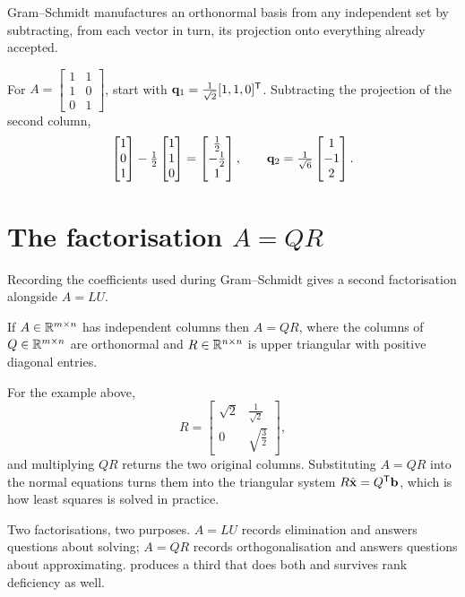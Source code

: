 Gram--Schmidt manufactures an orthonormal basis from any independent set by
subtracting, from each vector in turn, its projection onto everything already
accepted.

\begin{example}
For \(A=\begin{bmatrix}1&1\\1&0\\0&1\end{bmatrix}\), start with
\(\mathbf{q}_1=\tfrac{1}{\sqrt2}[1,1,0]^{\mathsf{T}}\). Subtracting the projection of the
second column,
\[
	\begin{bmatrix}1\\0\\1\end{bmatrix}
	-\tfrac{1}{2}\begin{bmatrix}1\\1\\0\end{bmatrix}
	=\begin{bmatrix}\tfrac12\\-\tfrac12\\1\end{bmatrix},
	\qquad
	\mathbf{q}_2=\tfrac{1}{\sqrt6}\begin{bmatrix}1\\-1\\2\end{bmatrix}.
\]
\end{example}

\section{The factorisation \texorpdfstring{\(A=QR\)}{A=QR}}

Recording the coefficients used during Gram--Schmidt gives a second
factorisation alongside \(A=LU\).

\begin{theorem}
If \(A\in\mathbb{R}^{m\times n}\) has independent columns then \(A=QR\), where the
columns of \(Q\in\mathbb{R}^{m\times n}\) are orthonormal and \(R\in\mathbb{R}^{n\times n}\) is
upper triangular with positive diagonal entries.
\end{theorem}

For the example above,
\[
	R=\begin{bmatrix}\sqrt2 & \tfrac{1}{\sqrt2}\\[2pt] 0 & \sqrt{\tfrac32}\end{bmatrix},
\]
and multiplying \(QR\) returns the two original columns. Substituting \(A=QR\)
into the normal equations turns them into the triangular system
\(R\hat{\mathbf{x}}=Q^{\mathsf{T}}\mathbf{b}\), which is how least squares is solved in
practice.

\begin{remark}
Two factorisations, two purposes. \(A=LU\) records elimination and answers
questions about solving; \(A=QR\) records orthogonalisation and answers
questions about approximating.  produces a third that does both and
survives rank deficiency as well.
\end{remark}
